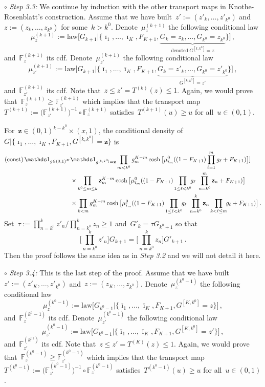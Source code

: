 \documentclass[final,numbib]{imaiai}%
\numberwithin{equation}{section}
\def\bz{\mathbf{z}}
\def\bbF{\mathds{F}}
\renewcommand{\bar}{\overline}
\def\\bUnif{\text{\bUnif}}
\newcommand{\<}{\langle}
\renewcommand{\>}{\rangle}
\newcommand{\1}{\mathds{1}}
\begin{document}
{ \medskip
 
 \noindent
 {$\circ$ \it Step 3.3: } We continue by induction with the other transport maps in Knothe-Rosenblatt's construction. Assume that we have built~$z':=(z'_{k},\ldots,z'_{k^0})$ and~$z:=(z_{k},\ldots,z_{k^0})$ for some~$k>k^0$. Denote~$\mu_{z}^{(k+1)}$ the following conditional law  
 \[
 \mu_{z}^{(k+1)}:=\mathrm{law}\big[G_{k+1}|\{\bar \imath_1,\ldots,\bar \imath_K,F_{K+1}, \underbrace{G_{k}=z_{k},\ldots, G_{k^0}=z_{k^0}}_{\mathrm{denoted\ }G^{[k,k^0]}=z}\}\big]\,,
 \]
 and~$\bbF_{z}^{(k+1)}$ its cdf. Denote~$\mu_{z'}^{(k+1)}$ the following conditional law  
 \[
 \mu_{z'}^{(k+1)}:=\mathrm{law}\big[G_{k+1}|\{\bar \imath_1,\ldots,\bar \imath_K,F_{K+1}, \underbrace{G_{k}=z'_{k},\ldots, G_{k^0}=z'_{k^0}}_{G^{[k,k^0]}=z'}\}\big]\,,
 \]
 and~$\bbF_{z'}^{(k+1)}$ its cdf. Note that~$z\leq z'=T^{(k)}(z)\leq 1$. Again, we would prove that~$\bbF_{z}^{(k+1)}\geq \bbF_{z'}^{(k+1)}$ which implies that the transport map~$T^{(k+1)}:=\big(\bbF_{z'}^{(k+1)}\big)^{-1}\circ \bbF_{z}^{(k+1)}$ satisfies~$T^{(k+1)}(u)\geq u$ for all~$u\in(0,1)$.
 
 For~$\bz\in(0,1)^{k-k^0}\times(x,1)$, the conditional density of~$G|\{\bar \imath_1,\ldots,\bar \imath_K,F_{K+1}, G^{[k,k^0]}=\bz\}$ is
 \begin{align}
 \mathrm{(const)}\,\mathds 1_{g\in(0,1)^K}&\mathds 1_{g^{[k,k^0]}=\bz}
 \prod_{m< k^0}g_m^{K-m}\cosh\big[{\mu^0_{\bar\imath_m}}((1-F_{K+1})\prod_{\ell=1}^mg_\ell+F_{K+1})\big]\notag]\\
 &\times \prod_{k^0\leq m\leq k}\bz_m^{K-m}\cosh\big[{\mu^0_{\bar\imath_m}}((1-F_{K+1})\prod_{1\leq \ell<k^0}\!\!g_\ell\,\,\prod_{n=k^0}^m\bz_n+F_{K+1})\big]\notag\\
&\times \prod_{k<m}g_m^{K-m}\cosh\big[{\mu^0_{\bar\imath_m}}((1-F_{K+1})\prod_{1\leq \ell<k^0}\!\!g_\ell\,\,\prod_{n=k^0}^k\bz_n\prod_{k< \ell\leq m}\!\!g_\ell+F_{K+1})\big]\,.\notag
 \end{align}
Set~$\tau:=\prod_{n=k^0}^kz'_n/\prod_{n=k^0}^kz_n\geq 1$ and~$G'_{k}=\tau G_{k^0+1}$ so that 
 \[
\Big[\prod_{n=k^0}^kz'_n\Big] G_{k+1}=\Big[\prod_{n=k^0}^kz_n\Big] G'_{k+1}\,.
 \]
Then the proof follows the same idea as in {\it Step 3.2} and we will not detail it here.
 \medskip
 
 \noindent
 {$\circ$ \it Step 3.4: } This is the last step of the proof. Assume that we have built~$z':=(z'_{K},\ldots,z'_{k^0})$ and~$z:=(z_{K},\ldots,z_{k^0})$. Denote~$\mu_{z}^{(k^0-1)}$ the following conditional law  
 \[
 \mu_{z}^{(k^0-1)}:=\mathrm{law}\big[G_{k^0-1}|\{\bar \imath_1,\ldots,\bar \imath_K,F_{K+1}, G^{[K,k^0]}=z\}\big]\,,
 \]
 and~$\bbF_{z}^{(k^0-1)}$ its cdf. Denote~$\mu_{z'}^{(k^0-1)}$ the following conditional law  
 \[
 \mu_{z'}^{(k^0-1)}:=\mathrm{law}\big[G_{k^0-1}|\{\bar \imath_1,\ldots,\bar \imath_K,F_{K+1}, G^{[K,k^0]}=z'\}\big]\,,
 \]
 and~$\bbF_{z'}^{(k^01)}$ its cdf. Note that~$z\leq z'=T^{(K)}(z)\leq 1$. Again, we would prove that~$\bbF_{z}^{(k^0-1)}\geq \bbF_{z'}^{(k^0-1)}$ which implies that the transport map~$T^{(k^0-1)}:=\big(\bbF_{z'}^{(k^0-1)}\big)^{-1}\circ \bbF_{z}^{(k^0-1)}$ satisfies~$T^{(k^0-1)}(u)\geq u$ for all~$u\in(0,1)$.

}
\end{document}

